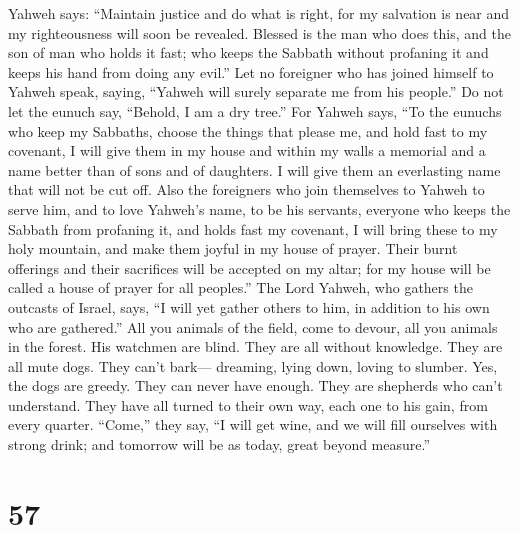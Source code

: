  Yahweh says: ``Maintain justice and do what is right, for
my salvation is near and my righteousness will soon be revealed.
 Blessed is the man who does this, and the son of man who
holds it fast; who keeps the Sabbath without profaning it and keeps his
hand from doing any evil.''  Let no foreigner who has joined
himself to Yahweh speak, saying, ``Yahweh will surely separate me from
his people.'' Do not let the eunuch say, ``Behold, I am a dry tree.''
 For Yahweh says, ``To the eunuchs who keep my Sabbaths,
choose the things that please me, and hold fast to my covenant,
 I will give them in my house and within my walls a memorial
and a name better than of sons and of daughters. I will give them an
everlasting name that will not be cut off.  Also the
foreigners who join themselves to Yahweh to serve him, and to love
Yahweh's name, to be his servants, everyone who keeps the Sabbath from
profaning it, and holds fast my covenant,  I will bring
these to my holy mountain, and make them joyful in my house of prayer.
Their burnt offerings and their sacrifices will be accepted on my altar;
for my house will be called a house of prayer for all peoples.''
 The Lord Yahweh, who gathers the outcasts of Israel, says,
``I will yet gather others to him, in addition to his own who are
gathered.''  All you animals of the field, come to devour,
all you animals in the forest.  His watchmen are blind.
They are all without knowledge. They are all mute dogs. They can't
bark--- dreaming, lying down, loving to slumber.  Yes, the
dogs are greedy. They can never have enough. They are shepherds who
can't understand. They have all turned to their own way, each one to his
gain, from every quarter.  ``Come,'' they say, ``I will get
wine, and we will fill ourselves with strong drink; and tomorrow will be
as today, great beyond measure.''

\hypertarget{section-53}{%
\section{57}\label{section-53}}

